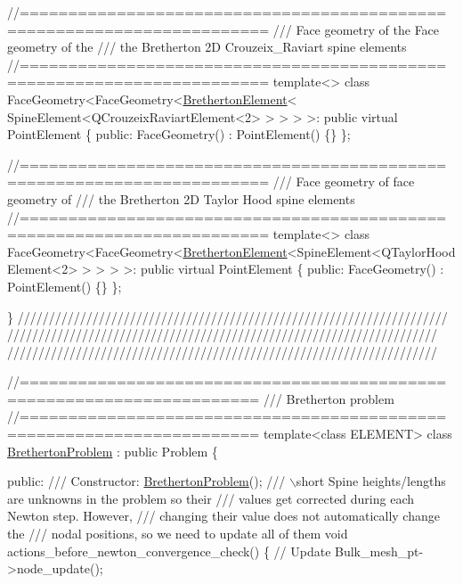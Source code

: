 \begin{DoxyCodeInclude}
\textcolor{comment}{//=======================================================================}\textcolor{comment}{}
\textcolor{comment}{/// Face geometry of the Face geometry of the }
\textcolor{comment}{///  the Bretherton 2D Crouzeix\_Raviart spine elements}
\textcolor{comment}{}\textcolor{comment}{//=======================================================================}
\textcolor{keyword}{template}<>
\textcolor{keyword}{class }FaceGeometry<FaceGeometry<\hyperlink{classBrethertonElement}{BrethertonElement}<
 SpineElement<QCrouzeixRaviartElement<2> > > > >: \textcolor{keyword}{public} \textcolor{keyword}{virtual} PointElement
\{
  \textcolor{keyword}{public}:
 FaceGeometry() : PointElement() \{\}
\};



\textcolor{comment}{//=======================================================================}\textcolor{comment}{}
\textcolor{comment}{/// Face geometry of face geometry of }
\textcolor{comment}{/// the Bretherton 2D Taylor Hood spine elements}
\textcolor{comment}{}\textcolor{comment}{//=======================================================================}
\textcolor{keyword}{template}<>
\textcolor{keyword}{class }FaceGeometry<FaceGeometry<\hyperlink{classBrethertonElement}{BrethertonElement}<SpineElement<QTaylorHoodElement<2> > > >
       >: \textcolor{keyword}{public} \textcolor{keyword}{virtual} PointElement
\{
  \textcolor{keyword}{public}:
 FaceGeometry() : PointElement() \{\}
\};


\}
\textcolor{comment}{}
\textcolor{comment}{/////////////////////////////////////////////////////////////////////}
\textcolor{comment}{/////////////////////////////////////////////////////////////////////}
\textcolor{comment}{/////////////////////////////////////////////////////////////////////}
\textcolor{comment}{}

\textcolor{comment}{//======================================================================}\textcolor{comment}{}
\textcolor{comment}{/// Bretherton problem}
\textcolor{comment}{}\textcolor{comment}{//======================================================================}
\textcolor{keyword}{template}<\textcolor{keyword}{class} ELEMENT>
\textcolor{keyword}{class }\hyperlink{classBrethertonProblem}{BrethertonProblem} : \textcolor{keyword}{public} Problem
\{


\textcolor{keyword}{public}:
\textcolor{comment}{}
\textcolor{comment}{ /// Constructor: }
\textcolor{comment}{} \hyperlink{classBrethertonProblem}{BrethertonProblem}();
\textcolor{comment}{}
\textcolor{comment}{ /// \(\backslash\)short Spine heights/lengths are unknowns in the problem so their}
\textcolor{comment}{ /// values get corrected during each Newton step. However,}
\textcolor{comment}{ /// changing their value does not automatically change the}
\textcolor{comment}{ /// nodal positions, so we need to update all of them}
\textcolor{comment}{} \textcolor{keywordtype}{void} actions\_before\_newton\_convergence\_check()
  \{
   \textcolor{comment}{// Update}
   Bulk\_mesh\_pt->node\_update();


\end{DoxyCodeInclude}
